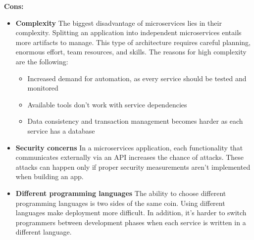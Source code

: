 \documentclass[10pt,a4paper]{article}
\begin{document}
\textbf{Cons:}
\begin{itemize}
	\item \textbf{Complexity}
The biggest disadvantage of microservices lies in their complexity. Splitting an application into independent microservices entails more artifacts to manage. This type of architecture requires careful planning, enormous effort, team resources, and skills. The reasons for high complexity are the following:
\begin{itemize}
	\item Increased demand for automation, as every service should be tested and monitored
	\item Available tools don’t work with service dependencies
	\item Data consistency and transaction management becomes harder as each service has a database
\end{itemize}
	\item \textbf{Security concerns}
In a microservices application, each functionality that communicates externally via an API increases the chance of attacks. These attacks can happen only if proper security measurements aren’t implemented when building an app.
	\item \textbf{Different programming languages}
The ability to choose different programming languages is two sides of the same coin. Using different languages make deployment more difficult. In addition, it’s harder to switch programmers between development phases when each service is written in a different language.
\end{itemize}
\end{document}
